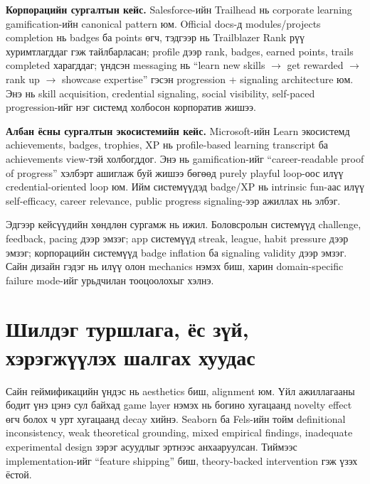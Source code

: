 \begin{sloppy}
\textbf{Корпорацийн сургалтын кейс.} Salesforce-ийн Trailhead нь corporate learning gamification-ийн canonical pattern юм. Official docs-д modules/projects completion нь badges ба points өгч, тэдгээр нь Trailblazer Rank рүү хуримтлагддаг гэж тайлбарласан; profile дээр rank, badges, earned points, trails completed харагддаг; үндсэн messaging нь ``learn new skills $\to$ get rewarded $\to$ rank up $\to$ showcase expertise'' гэсэн progression + signaling architecture юм. Энэ нь skill acquisition, credential signaling, social visibility, self-paced progression-ийг нэг системд холбосон корпоратив жишээ.

\textbf{Албан ёсны сургалтын экосистемийн кейс.} Microsoft-ийн Learn экосистемд achievements, badges, trophies, XP нь profile-based learning transcript ба achievements view-тэй холбогддог. Энэ нь gamification-ийг ``career-readable proof of progress'' хэлбэрт ашиглаж буй жишээ бөгөөд purely playful loop-оос илүү credential-oriented loop юм. Ийм системүүдэд badge/XP нь intrinsic fun-аас илүү self-efficacy, career relevance, public progress signaling-ээр ажиллах нь элбэг.

Эдгээр кейсүүдийн хөндлөн сургамж нь ижил. Боловсролын системүүд challenge, feedback, pacing дээр эмзэг; app системүүд streak, league, habit pressure дээр эмзэг; корпорацийн системүүд badge inflation ба signaling validity дээр эмзэг. Сайн дизайн гэдэг нь илүү олон mechanics нэмэх биш, харин domain-specific failure mode-ийг урьдчилан тооцоолохыг хэлнэ.

\section*{Шилдэг туршлага, ёс зүй, хэрэгжүүлэх шалгах хуудас}

Сайн геймификацийн үндэс нь aesthetics биш, alignment юм. Үйл ажиллагааны бодит үнэ цэнэ сул байхад game layer нэмэх нь богино хугацаанд novelty effect өгч болох ч урт хугацаанд decay хийнэ. Seaborn ба Fels-ийн тойм definitional inconsistency, weak theoretical grounding, mixed empirical findings, inadequate experimental design зэрэг асуудлыг эртнээс анхааруулсан. Тиймээс implementation-ийг ``feature shipping'' биш, theory-backed intervention гэж үзэх ёстой.


\end{sloppy}
